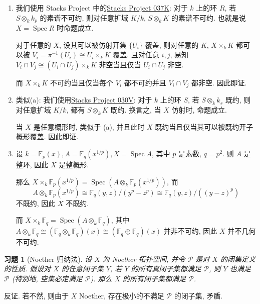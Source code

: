 \documentclass{article}
\theoremstyle{exercise}
\newtheorem{exercise}{习题}[section]
\newenvironment{proofc}{\proof}{\endproof}
\def\F{\mathbb{F}}
\def\Spec{\operatorname{Spec}}
\def\Stacks#1{\href{https://stacks.math.columbia.edu/tag/#1}{Stacks Project #1}}
\begin{document}
\begin{proofc}
  \begin{enumerate}[label={(\alph*)}]
    \item 我们使用 Stacks Project 中的\Stacks{037K}:
          对于 $k$ 上的环 $R$, 若 $S \otimes_k k_p$ 的素谱不可约,
          则对任意扩域 $K / k$, $S \otimes_k K$ 的素谱不可约.
          也就是说 $X = \Spec R$ 时命题成立.

          对于任意的 $X$, 设其可以被仿射开集 $\{ U_i \}$ 覆盖,
          则对任意的 $K$, $X \times_k K$ 都可以被 $V_i = \pi^{-1}(U_i) \cong U_i \times_k K$ 覆盖.
          且对任意 $i, j$, 易知 $V_i \cap V_j \cong (U_i \cap U_j) \times_k K$
          非空当且仅当 $U_i \cap U_j$ 非空.

          而 $X \times_k K$ 不可约当且仅当每个 $V_i$ 都不可约并且 $V_i \cap V_j$ 都非空.
          因此即证.
    \item 类似(a): 我们使用\Stacks{030V}:
          对于 $k$ 上的环 $S$, 若 $S \otimes_k k_s$ 既约,
          则对任意扩域 $K / k$, 都有 $S \otimes_k K$ 既约.
          换言之, 当 $X$ 仿射时, 命题成立.

          当 $X$ 是任意概形时, 类似于 (a), 并且此时 $X$ 既约当且仅当其可以被既约开子概形覆盖.
          因此即证.
    \item 设 $k = \F_p(x), A = \F_q(x^{1/p}), X = \Spec A$,
          其中 $p$ 是素数, $q = p^2$.
          则 $A$ 是整环, 因此 $X$ 是整概形.

          那么 $X \times_k \F_p(x^{1/p}) = \Spec (A \otimes_k \F_p(x^{1/p}))$,
          而
          \[
          A \otimes_k \F_p(x^{1/p}) \cong \F_q(y, z) / (y^p - z^p)
          \cong \F_q(y, z) / ((y - z)^p)
          \]
          不既约, 因此 $X$ 不既约.

          而 $X \times_k \F_q = \Spec (A \otimes_k \F_q)$,
          其中 $A \otimes_k \F_q \cong (\F_q \otimes_k \F_q)(x) \cong (\F_q \oplus \F_q)(x)$ 并非不可约,
          因此 $X$ 并不几何不可约.
          \qedhere
  \end{enumerate}
\end{proofc}

\begin{exercise}[Noether 归纳法]
  设 $X$ 为 Noether 拓扑空间, 并令 $\mathcal{P}$ 是对 $X$ 的闭集定义的性质.
  假设对 $X$ 的任意闭子集 $Y$, 若 $Y$ 的所有真闭子集都满足 $\mathcal{P}$,
  则 $Y$ 也满足 $\mathcal{P}$ (特别地, 空集必定满足 $\mathcal{P}$).
  那么 $X$ 的所有闭子集都满足 $\mathcal{P}$.
\end{exercise}

\begin{proofc}
  反证. 若不然, 则由于 $X$ Noether, 存在极小的不满足 $\mathcal{P}$ 的闭子集, 矛盾.
\end{proofc}
\end{document}

